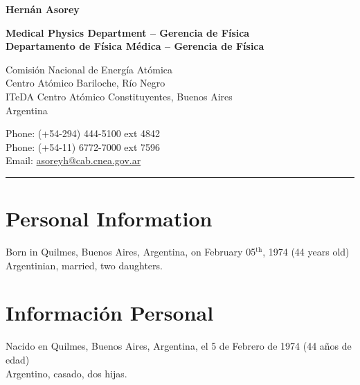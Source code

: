 \begin{center}{\huge \bf Hernán Asorey}\\[1cm]\end{center}

\begin{center}
\ifeng
{\bf{Medical Physics Department -- Gerencia de Física}}
\\
\else
{\bf{Departamento de Física Médica -- Gerencia de Física}}\\
\fi
\end{center}
\begin{minipage}[t]{0.60\textwidth}
  Comisión Nacional de Energía Atómica\\
  Centro Atómico Bariloche, Río Negro\\
  ITeDA
  Centro Atómico Constituyentes, Buenos Aires\\
  Argentina\\[.2cm]
\end{minipage}
\begin{minipage}[t]{0.465\textwidth}
  Phone: (+54-294) 444-5100 ext 4842\\
  Phone: (+54-11) 6772-7000 ext 7596\\
  Email: \href{mailto:asoreyh@cab.cnea.gov.ar}{asoreyh@cab.cnea.gov.ar}\\
\end{minipage}

\hrule

\ifeng
\section*{Personal Information}
Born in Quilmes, Buenos Aires, Argentina, on February 05$^\mathrm{th}$, 1974 (44 years old)\\
Argentinian, married, two daughters.
\else
\section*{Información Personal}
Nacido en Quilmes, Buenos Aires, Argentina, el 5 de Febrero de 1974 (44 años de edad)\\
Argentino, casado, dos hijas.
\fi
